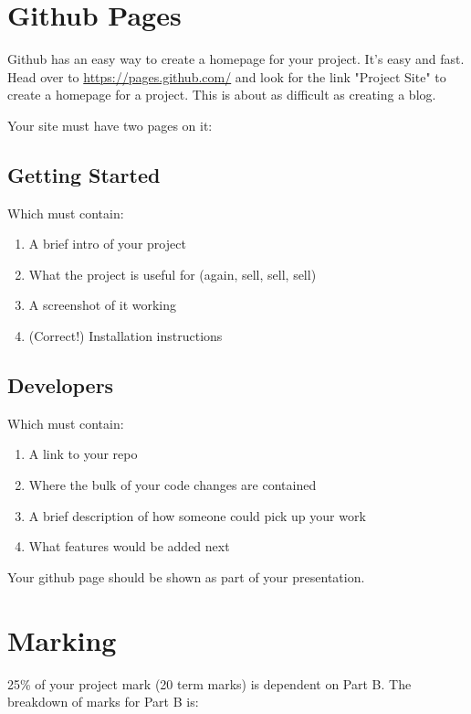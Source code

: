 \documentclass[letterpaper]{article}
\begin{document}
\section{Github Pages}

Github has an easy way to create a homepage for your project.  It's easy and fast.  Head over to \url{https://pages.github.com/} and look for the link "Project Site" to create a homepage for a project.  This is about as difficult as creating a blog.

Your site must have two pages on it:

\subsection*{Getting Started}

Which must contain:

\begin{enumerate}
\item    A brief intro of your project
\item    What the project is useful for (again, sell, sell, sell)
\item    A screenshot of it working
\item    (Correct!) Installation instructions
\end{enumerate}

\subsection*{Developers}

Which must contain:

\begin{enumerate}
\item    A link to your repo
\item    Where the bulk of your code changes are contained
\item    A brief description of how someone could pick up your work
\item    What features would be added next
\end{enumerate}

Your github page should be shown as part of your presentation.

\section*{Marking}

25\% of your project mark (20 term marks) is dependent on Part B.  The
breakdown of marks for Part B is:
\end{document}
